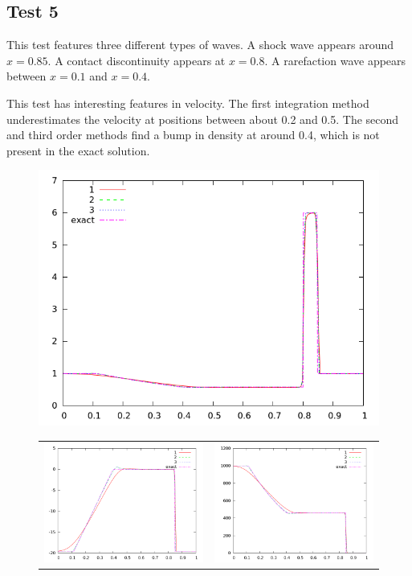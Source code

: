 \documentclass[10pt]{article}
\begin{document}
\clearpage

\subsection{Test 5}
This test features three different types of waves. A shock wave appears around $x=0.85$. A contact discontinuity appears at $x=0.8$. A rarefaction wave appears between $x=0.1$ and $x=0.4$.

This test has interesting features in velocity. The first integration method underestimates the velocity at positions between about 0.2 and 0.5. The second and third order methods find a bump in density at around 0.4, which is not present in the exact solution.

\begin{figure}[h]
  \begin{center}
     \includegraphics[width=.95\textwidth]{den_T5.png}
	\begin{tabular}{cc}
      \includegraphics[width=.475\textwidth]{vel_T5.png} &
	  \includegraphics[width=.475\textwidth]{prs_T5.png}

\end{tabular}
\end{center}
\end{figure}
\end{document}
